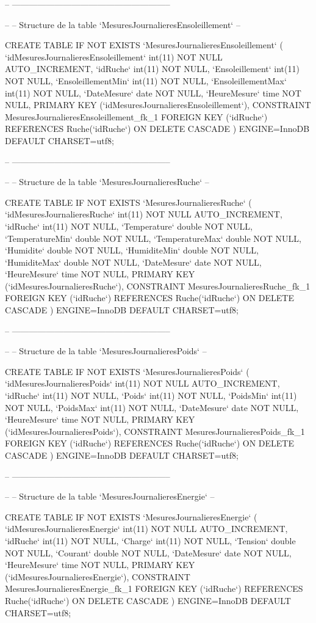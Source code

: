 \begin{DoxyCode}
-- --------------------------------------------------------

--
-- Structure de la table `MesuresJournalieresEnsoleillement`
--

CREATE TABLE IF NOT EXISTS `MesuresJournalieresEnsoleillement` (
  `idMesuresJournalieresEnsoleillement` int(11) NOT NULL AUTO\_INCREMENT,
  `idRuche` int(11) NOT NULL,
  `Ensoleillement` int(11) NOT NULL,
  `EnsoleillementMin` int(11) NOT NULL,
  `EnsoleillementMax` int(11) NOT NULL,
  `DateMesure` date NOT NULL,
  `HeureMesure` time NOT NULL,
  PRIMARY KEY (`idMesuresJournalieresEnsoleillement`),
  CONSTRAINT MesuresJournalieresEnsoleillement\_fk\_1 FOREIGN KEY (`idRuche`) REFERENCES Ruche(`idRuche`) ON
       DELETE CASCADE
) ENGINE=InnoDB DEFAULT CHARSET=utf8;

-- --------------------------------------------------------

--
-- Structure de la table `MesuresJournalieresRuche`
--

CREATE TABLE IF NOT EXISTS `MesuresJournalieresRuche` (
  `idMesuresJournalieresRuche` int(11) NOT NULL AUTO\_INCREMENT, 
  `idRuche` int(11) NOT NULL,
  `Temperature` double NOT NULL,
  `TemperatureMin` double NOT NULL,
  `TemperatureMax` double NOT NULL,
  `Humidite` double NOT NULL,
  `HumiditeMin` double NOT NULL,
  `HumiditeMax` double NOT NULL,
  `DateMesure` date NOT NULL,
  `HeureMesure` time NOT NULL,
  PRIMARY KEY (`idMesuresJournalieresRuche`),
  CONSTRAINT MesuresJournalieresRuche\_fk\_1 FOREIGN KEY (`idRuche`) REFERENCES Ruche(`idRuche`) ON DELETE
       CASCADE
) ENGINE=InnoDB DEFAULT CHARSET=utf8;


-- --------------------------------------------------------

--
-- Structure de la table `MesuresJournalieresPoids`
--

CREATE TABLE IF NOT EXISTS `MesuresJournalieresPoids` (
  `idMesuresJournalieresPoids` int(11) NOT NULL AUTO\_INCREMENT, 
  `idRuche` int(11) NOT NULL,
  `Poids` int(11) NOT NULL,
  `PoidsMin` int(11) NOT NULL,
  `PoidsMax` int(11) NOT NULL,
  `DateMesure` date NOT NULL,
  `HeureMesure` time NOT NULL,  
  PRIMARY KEY (`idMesuresJournalieresPoids`),
  CONSTRAINT MesuresJournalieresPoids\_fk\_1 FOREIGN KEY (`idRuche`) REFERENCES Ruche(`idRuche`) ON DELETE
       CASCADE
) ENGINE=InnoDB DEFAULT CHARSET=utf8;

-- --------------------------------------------------------

--
-- Structure de la table `MesuresJournalieresEnergie`
--

CREATE TABLE IF NOT EXISTS `MesuresJournalieresEnergie` (
  `idMesuresJournalieresEnergie` int(11) NOT NULL AUTO\_INCREMENT, 
  `idRuche` int(11) NOT NULL,
  `Charge` int(11) NOT NULL,
  `Tension` double NOT NULL,
  `Courant` double NOT NULL,
  `DateMesure` date NOT NULL,
  `HeureMesure` time NOT NULL,
  PRIMARY KEY (`idMesuresJournalieresEnergie`),
  CONSTRAINT MesuresJournalieresEnergie\_fk\_1 FOREIGN KEY (`idRuche`) REFERENCES Ruche(`idRuche`) ON DELETE
       CASCADE
) ENGINE=InnoDB DEFAULT CHARSET=utf8;
\end{DoxyCode}
 